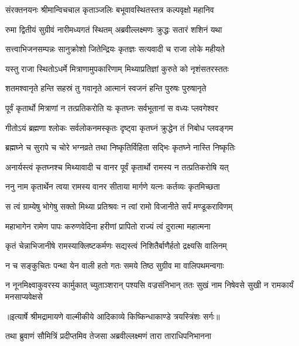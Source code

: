 \twolineshloka
{संरक्तनयनः श्रीमान्विचचाल कृताञ्जलिः}
{बभूवावस्थितस्तत्र कल्पवृक्षो महानिव} %

\twolineshloka
{रुमा द्वितीयं सुग्रीवं नारीमध्यगतं स्थितम्}
{अब्रवील्लक्ष्मणः क्रुद्धः सतारं शशिनं यथा} %

\twolineshloka
{सत्त्वाभिजनसम्पन्नः सानुक्रोशो जितेन्द्रियः}
{कृतज्ञः सत्यवादी च राजा लोके महीयते} %

\twolineshloka
{यस्तु राजा स्थितोऽधर्मे मित्राणामुपकारिणाम्}
{मिथ्याप्रतिज्ञां कुरुते को नृशंसतरस्ततः} %

\twolineshloka
{शतमश्वानृते हन्ति सहस्रं तु गवानृते}
{आत्मानं स्वजनं हन्ति पुरुषः पुरुषानृते} %

\twolineshloka
{पूर्वं कृतार्थो मित्राणां न तत्प्रतिकरोति यः}
{कृतघ्नः सर्वभूतानां स वध्यः प्लवगेश्वर} %

\twolineshloka
{गीतोऽयं ब्रह्मणा श्लोकः सर्वलोकनमस्कृतः}
{दृष्ट्वा कृतघ्नं क्रुद्धेन तं निबोध प्लवङ्गम} %

\twolineshloka
{ब्रह्मघ्ने च सुरापे च चोरे भग्नव्रते तथा}
{निष्कृतिर्विहिता सद्भिः कृतघ्ने नास्ति निष्कृतिः} %

\twolineshloka
{अनार्यस्त्वं कृतघ्नश्च मिथ्यावादी च वानर}
{पूर्वं कृतार्थो रामस्य न तत्प्रतिकरोषि यत्} %

\twolineshloka
{ननु नाम कृतार्थेन त्वया रामस्य वानर}
{सीताया मार्गणे यत्नः कर्तव्यः कृतमिच्छता} %

\twolineshloka
{स त्वं ग्राम्येषु भोगेषु सक्तो मिथ्या प्रतिश्रवः}
{न त्वां रामो विजानीते सर्पं मण्डूकराविणम्} %

\twolineshloka
{महाभागेन रामेण पापः करुणवेदिना}
{हरीणां प्रापितो राज्यं त्वं दुरात्मा महात्मना} %

\twolineshloka
{कृतं चेन्नाभिजानीषे रामस्याक्लिष्टकर्मणः}
{सद्यस्त्वं निशितैर्बाणैर्हतो द्रक्ष्यसि वालिनम्} %

\twolineshloka
{न च सङ्कुचितः पन्था येन वाली हतो गतः}
{समये तिष्ठ सुग्रीव मा वालिपथमन्वगाः} %

\fourlineindentedshloka
{न नूनमिक्ष्वाकुवरस्य कार्मुकात्}
{च्युताञ्शरान् पश्यसि वज्रसंनिभान्}
{ततः सुखं नाम निषेवसे सुखी}
{न रामकार्यं मनसाप्यवेक्षसे} %


{॥इत्यार्षे श्रीमद्रामायणे वाल्मीकीये आदिकाव्ये किष्किन्धाकाण्डे त्रयस्त्रिंशः सर्गः॥}


\twolineshloka
{तथा ब्रुवाणं सौमित्रिं प्रदीप्तमिव तेजसा}
{अब्रवील्लक्ष्मणं तारा ताराधिपनिभानना} %

